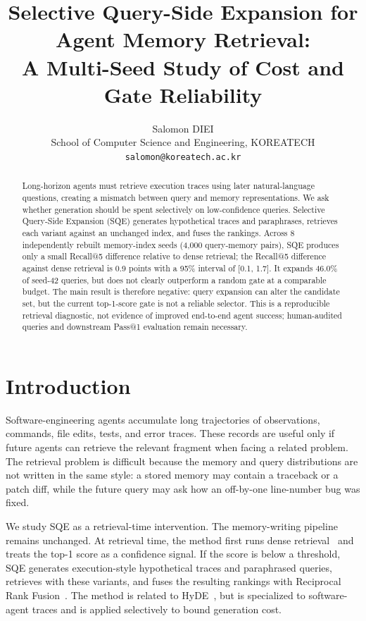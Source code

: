 \documentclass[10pt,twocolumn]{article}
\title{\vspace{-1.5em}Selective Query-Side Expansion for Agent Memory Retrieval:\\A Multi-Seed Study of Cost and Gate Reliability}
\author{Salomon DIEI\\School of Computer Science and Engineering, KOREATECH\\\texttt{salomon@koreatech.ac.kr}}
\date{}
\begin{document}
\maketitle

\begin{abstract}
Long-horizon agents must retrieve execution traces using later natural-language
questions, creating a mismatch between query and memory representations. We ask
whether generation should be spent selectively on low-confidence queries. Selective
Query-Side Expansion (SQE) generates hypothetical traces and paraphrases, retrieves
each variant against an unchanged index, and fuses the rankings. Across
8 independently rebuilt memory-index seeds (4,000 query-memory pairs), SQE produces only a
small Recall@5 difference relative to dense retrieval; the Recall@5 difference against dense retrieval is 0.9 points with a 95\% interval of [0.1, 1.7]. It
expands 46.0\% of seed-42 queries, but does not clearly outperform a random
gate at a comparable budget. The main result is therefore negative: query expansion
can alter the candidate set, but the current top-1-score gate is not a reliable
selector. This is a reproducible retrieval diagnostic, not evidence of improved
end-to-end agent success; human-audited queries and downstream Pass@1 evaluation
remain necessary.
\end{abstract}

\section{Introduction}
Software-engineering agents accumulate long trajectories of observations,
commands, file edits, tests, and error traces. These records are useful only if
future agents can retrieve the relevant fragment when facing a related problem.
The retrieval problem is difficult because the memory and query distributions are
not written in the same style: a stored memory may contain a traceback or a patch
diff, while the future query may ask how an off-by-one line-number bug was fixed.

We study SQE as a retrieval-time intervention. The memory-writing
pipeline remains unchanged. At retrieval time, the method first runs dense
retrieval~\cite{karpukhin2020dpr} and treats the top-1 score as a confidence
signal. If the score is below a threshold, SQE generates execution-style hypothetical traces and paraphrased
queries, retrieves with these variants, and fuses the resulting rankings with
Reciprocal Rank Fusion~\cite{cormack2009rrf}. The method is related to
HyDE~\cite{gao2023hyde}, but is specialized to software-agent traces and is
applied selectively to bound generation cost.
\end{document}
